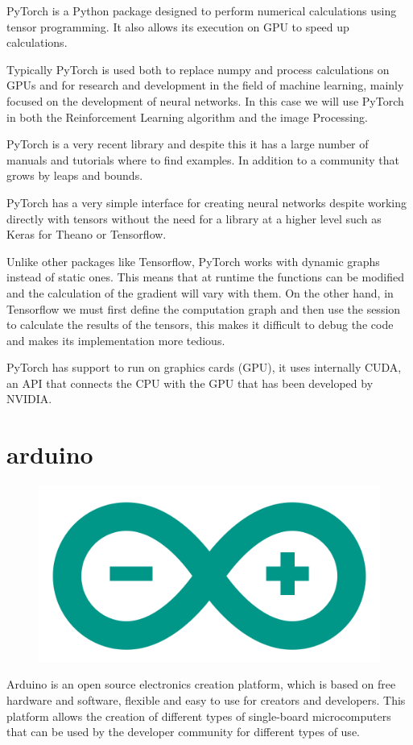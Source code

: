 		PyTorch is a Python package designed to perform numerical calculations using tensor programming. It also allows its execution on GPU to speed up calculations.
	
		Typically PyTorch is used both to replace numpy and process calculations on GPUs and for research and development in the field of machine learning, mainly focused on the development of neural networks. In this case we will use PyTorch in both the Reinforcement Learning algorithm and the image Processing.
	
		PyTorch is a very recent library and despite this it has a large number of manuals and tutorials where to find examples. In addition to a community that grows by leaps and bounds.
		
		PyTorch has a very simple interface for creating neural networks despite working directly with tensors without the need for a library at a higher level such as Keras for Theano or Tensorflow.
		
		Unlike other packages like Tensorflow, PyTorch works with dynamic graphs instead of static ones. This means that at runtime the functions can be modified and the calculation of the gradient will vary with them. On the other hand, in Tensorflow we must first define the computation graph and then use the session to calculate the results of the tensors, this makes it difficult to debug the code and makes its implementation more tedious.
		
		PyTorch has support to run on graphics cards (GPU), it uses internally CUDA, an API that connects the CPU with the GPU that has been developed by NVIDIA.

	\section{arduino}
		\begin{figure}[h!]
			\centering
			\includegraphics[width=0.7\linewidth]{Images/logos/arduino}
			\label{fig:arduino}
		\end{figure}
		Arduino is an open source electronics creation platform, which is based on free hardware and software, flexible and easy to use for creators and developers. This platform allows the creation of different types of single-board microcomputers that can be used by the developer community for different types of use.

